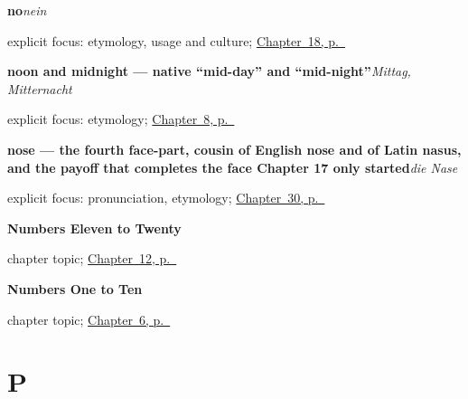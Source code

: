 \noindent\begin{minipage}[t]{\linewidth}
\raggedright
\textbf{no}\enspace\emph{nein}\par
\footnotesize explicit focus: etymology, usage and culture; \hyperref[ch:ge-yes-and-no]{Chapter~18, p.~\pageref*{ch:ge-yes-and-no}}
\end{minipage}\par\smallskip

\noindent\begin{minipage}[t]{\linewidth}
\raggedright
\textbf{noon and midnight — native \textquotedblleft{}mid-day\textquotedblright{} and \textquotedblleft{}mid-night\textquotedblright{}}\enspace\emph{Mittag, Mitternacht}\par
\footnotesize explicit focus: etymology; \hyperref[ch:time]{Chapter~8, p.~\pageref*{ch:time}}
\end{minipage}\par\smallskip

\noindent\begin{minipage}[t]{\linewidth}
\raggedright
\textbf{nose — the fourth face-part, cousin of English nose and of Latin nasus, and the payoff that completes the face Chapter 17 only started}\enspace\emph{die Nase}\par
\footnotesize explicit focus: pronunciation, etymology; \hyperref[ch:ge-face-parts]{Chapter~30, p.~\pageref*{ch:ge-face-parts}}
\end{minipage}\par\smallskip

\noindent\begin{minipage}[t]{\linewidth}
\raggedright
\textbf{Numbers Eleven to Twenty}\par
\footnotesize chapter topic; \hyperref[ch:numbers-11-20]{Chapter~12, p.~\pageref*{ch:numbers-11-20}}
\end{minipage}\par\smallskip

\noindent\begin{minipage}[t]{\linewidth}
\raggedright
\textbf{Numbers One to Ten}\par
\footnotesize chapter topic; \hyperref[ch:numbers-1-10]{Chapter~6, p.~\pageref*{ch:numbers-1-10}}
\end{minipage}\par\smallskip

\section*{P}

